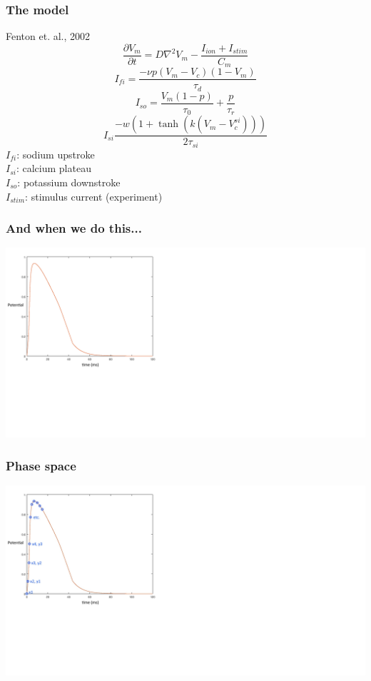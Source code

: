 \documentclass{beamer}
\begin{document}
	

	\begin{frame}
		\frametitle{The model}
		Fenton et. al., 2002
		$$ \frac{\partial V_m}{\partial t} = D \nabla^2 V_m - \frac{I_{ion}+I_{stim}}{C_m} $$
		$$ I_{fi} = \frac{-\nu p(V_m - V_c)(1-V_m)}{\tau_d} $$
		$$ I_{so} = \frac{V_m (1-p)}{\tau_0} + \frac{p}{\tau_r} $$
		$$ I_{si} \frac{-w(1+\tanh(k(V_m-V_c^{si})))}{2\tau_{si}} $$
		$I_{fi}$: sodium upstroke \\
		$I_{si}$: calcium plateau \\
		$I_{so}$: potassium downstroke \\
		$I_{stim}$: stimulus current (experiment)
	\end{frame}

	
	\begin{frame}
		\frametitle{And when we do this...}
		\includegraphics[scale=0.5]{ap.png}

	\end{frame}

	\begin{frame}
		\frametitle{Phase space}
		\includegraphics[scale=0.5]{phase.jpg}
	\end{frame}
\end{document}
